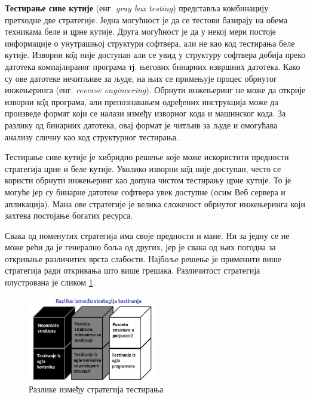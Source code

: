 \documentclass[12pt,oneside]{memoir}
\begin{document}
\begin{description}
\item \textbf{Тестирање сиве кутије} (енг. \textit{gray box testing}) представља комбинацију претходне две стратегије. Једна могућност је да се тестови базирају на обема техникама беле и црне кутије. Друга могућност је да у некој мери постоје информације о унутрашњој структури софтвера, али не као код тестирања беле кутије. Изворни к\^{о}д није доступан али се увид у структуру софтвера добија преко датотека компајлираног програма тј. његових бинарних извршних датотека. Како су ове датотеке нечитљиве за људе, на њих се примењује процес обрнутог инжењеринга (енг. \textit{reverse engineering}). Обрнути инжењеринг не може да открије изворни к\^{о}д програма, али препознавањем одређених инструкција може да произведе формат који се налази између изворног кода и машинског кода. За разлику од бинарних датотека, овај формат је читљив за људе и омогућава анализу сличну као код структурног тестирања. 
\par Тестирање сиве кутије је хибридно решење које може искористити предности стратегија црне и беле кутије. Уколико изворни к\^{о}д није доступан, често се користи обрнути инжењеринг као допуна чистом тестирању црне кутије. То је могуће јер су бинарне датотеке софтвера увек доступне (осим Веб сервера и апликација). Мана ове стратегије је велика сложеност обрнутог инжењеринга који захтева постојање богатих ресурса.
\end{description}

Свака од поменутих стратегија има своје предности и мане. Ни за једну се не може рећи да је генерално боља од других, јер је свака од њих погодна за откривање различитих врста слабости. Најбоље решење је применити више стратегија ради откривања што више грешака. Различитост стратегија илустрована је сликом \ref{fig:boxes}.

\begin{figure}[!ht]
\centering
\includegraphics[width=0.5\textwidth]{boxes.jpg}
\caption{Разлике између стратегија тестирања}
\label{fig:boxes}
\end{figure}
\end{document}
